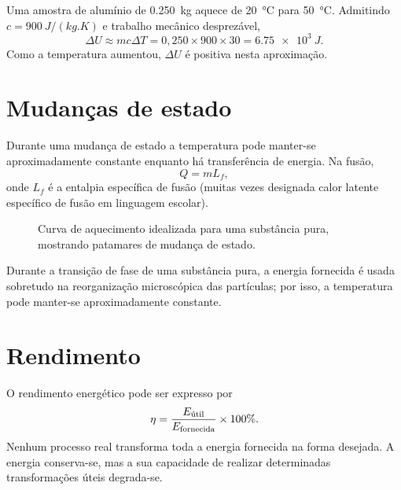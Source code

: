 \documentclass[11pt,a4paper,oneside]{book}
\begin{document}
\begin{exemplo}[title=Exemplo resolvido -- aquecimento e sinal de $\Delta U$]
Uma amostra de alumínio de \SI{0.250}{kg} aquece de \SI{20}{\celsius} para \SI{50}{\celsius}. Admitindo $c=\SI{900}{J/(kg.K)}$ e trabalho mecânico desprezável,
\[
\Delta U\approx mc\Delta T=0{,}250\times900\times30=\SI{6.75e3}{J}.
\]
Como a temperatura aumentou, $\Delta U$ é positiva nesta aproximação.
\end{exemplo}

\section{Mudanças de estado}
Durante uma mudança de estado a temperatura pode manter-se aproximadamente constante enquanto há transferência de energia. Na fusão,
\[
Q=mL_f,
\]
onde $L_f$ é a entalpia específica de fusão (muitas vezes designada calor latente específico de fusão em linguagem escolar).

\begin{figure}[H]
\centering
{}
\caption{Curva de aquecimento idealizada para uma substância pura, mostrando patamares de mudança de estado.}
\end{figure}
Durante a transição de fase de uma substância pura, a energia fornecida é usada sobretudo na reorganização microscópica das partículas; por isso, a temperatura pode manter-se aproximadamente constante.

\section{Rendimento}
O rendimento energético pode ser expresso por
\[
\eta=\frac{E_{\text{útil}}}{E_{\rm fornecida}}\times100\%.
\]
Nenhum processo real transforma toda a energia fornecida na forma desejada. A energia conserva-se, mas a sua capacidade de realizar determinadas transformações úteis degrada-se.
\end{document}
